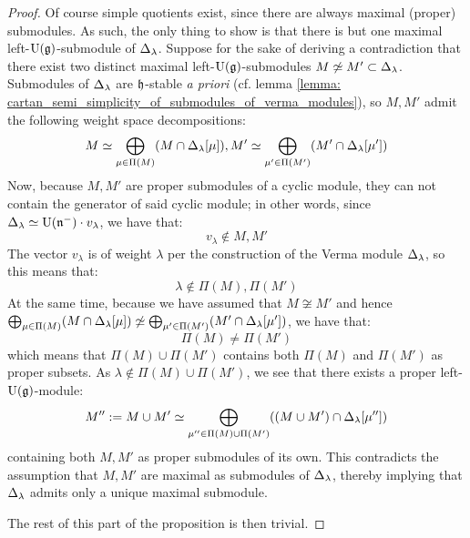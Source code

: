             \begin{proof}
                Of course simple quotients exist, since there are always maximal (proper) submodules. As such, the only thing to show is that there is but one maximal left-$\mathrm{U}(\mathfrak{g})$-submodule of $\Delta_{\lambda}$. Suppose for the sake of deriving a contradiction that there exist two distinct maximal left-$\mathrm{U}(\mathfrak{g})$-submodules $M \not \simeq M' \subset \Delta_{\lambda}$. Submodules of $\Delta_{\lambda}$ are $\mathfrak{h}$-stable \textit{a priori} (cf. lemma \ref{lemma: cartan_semi_simplicity_of_submodules_of_verma_modules}), so $M, M'$ admit the following weight space decompositions:
                    $$M \simeq \bigoplus_{\mu \in \Pi(M)} (M \cap \Delta_{\lambda}[\mu]), M' \simeq \bigoplus_{\mu' \in \Pi(M')} (M' \cap \Delta_{\lambda}[\mu'])$$
                Now, because $M, M'$ are proper submodules of a cyclic module, they can not contain the generator of said cyclic module; in other words, since $\Delta_{\lambda} \simeq \mathrm{U}(\mathfrak{n}^-) \cdot v_{\lambda}$, we have that:
                    $$v_{\lambda} \not \in M, M'$$
                The vector $v_{\lambda}$ is of weight $\lambda$ per the construction of the Verma module $\Delta_{\lambda}$, so this means that:
                    $$\lambda \not \in \Pi(M), \Pi(M')$$
                At the same time, because we have assumed that $M \not \cong M'$ and hence $\bigoplus_{\mu \in \Pi(M)} (M \cap \Delta_{\lambda}[\mu]) \not \simeq \bigoplus_{\mu' \in \Pi(M')} (M' \cap \Delta_{\lambda}[\mu'])$, we have that:
                    $$\Pi(M) \not = \Pi(M')$$
                which means that $\Pi(M) \cup \Pi(M')$ contains both $\Pi(M)$ and $\Pi(M')$ as proper subsets. As $\lambda \not \in \Pi(M) \cup \Pi(M')$, we see that there exists a proper left-$\mathrm{U}(\mathfrak{g})$-module:
                    $$M'' := M \cup M' \simeq \bigoplus_{\mu'' \in \Pi(M) \cup \Pi(M')} ( (M \cup M') \cap \Delta_{\lambda}[\mu''])$$
                containing both $M, M'$ as proper submodules of its own. This contradicts the assumption that $M, M'$ are maximal as submodules of $\Delta_{\lambda}$, thereby implying that $\Delta_{\lambda}$ admits only a unique maximal submodule.

                The rest of this part of the proposition is then trivial. 
            \end{proof}

